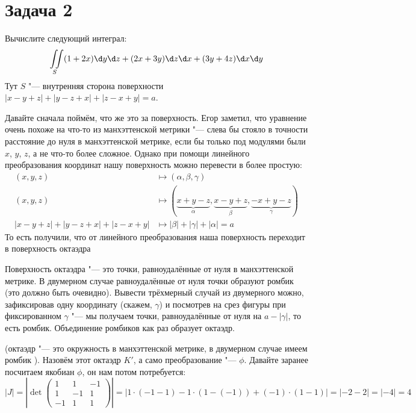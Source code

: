 \section{Задача 2}
	Вычислите следующий интеграл:
	\[
		\iint\limits_S (1+2x)\d y \d z + (2x+3y) \d z \d x + (3y + 4z) \d x \d y
	\]
	Тут $S$ "--- внутренняя сторона поверхности $|x-y+z|+|y-z+x|+|z-x+y|=a$.

	Давайте сначала поймём, что же это за поверхность.
	Егор заметил, что уравнение очень похоже на что-то из манхэттенской метрики "--- слева бы стояло в точности расстояние
	до нуля в манхэттенской метрике, если бы только под модулями были $x$, $y$, $z$, а не что-то более сложное.
	Однако при помощи линейного преобразования координат нашу поверхность можно перевести в более простую:
	\begin{align*}
		(x, y, z) &\mapsto (\alpha, \beta, \gamma) \\
		(x, y, z) &\mapsto (\underbrace{x+y-z}_{\alpha}, \underbrace{x-y+z}_{\beta}, \underbrace{-x+y-z}_{\gamma}) \\
		|x-y+z|+|y-z+x|+|z-x+y| &\mapsto |\beta| + |\gamma| + |\alpha| = a
	\end{align*}
	То есть получили, что от линейного преобразования наша поверхность переходит в поверхность октаэдра
	\begin{Rem}
		Поверхность октаэдра "--- это точки, равноудалённые от нуля в манхэттенской метрике.
		В двумерном случае равноудалённые от нуля точки образуют ромбик (это должно быть очевидно).
		Вывести трёхмерный случай из двумерного можно, зафиксировав одну координату (скажем, $\gamma$) и посмотрев на срез
		фигуры при фиксированном $\gamma$ "--- мы получаем точки, равноудалённые от нуля на $a-|\gamma|$, то есть ромбик.
		Объединение ромбиков как раз образует октаэдр.
	\end{Rem}
	(октаэдр "--- это окружность в манхэттенской метрике, в двумерном случае имеем ромбик ).
	Назовём этот октаэдр $K'$, а само преобразование "--- $\phi$.
	Давайте заранее посчитаем якобиан $\phi$, он нам потом потребуется:
	\[
		|J| =
		\left|\det \begin{pmatrix}
			1 & 1 & -1 \\
			1 & -1 & 1 \\
			-1 & 1 & 1
		\end{pmatrix}\right| =
		|1\cdot(-1-1) - 1 \cdot(1-(-1)) + (-1)\cdot(1-1)| =
		|-2-2| = |-4| = 4
	\]

